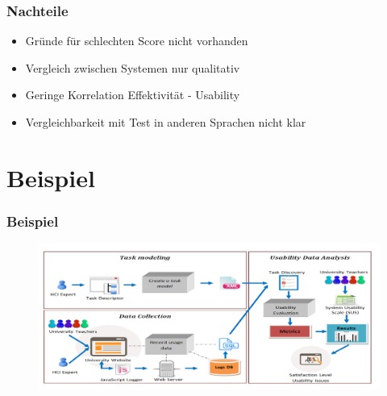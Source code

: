 \documentclass[12pt, aspectratio=169]{beamer}
\begin{document}
\begin{frame}
	\frametitle{Nachteile}
	\begin{itemize}
		\item<1> Gründe für schlechten Score nicht vorhanden
		\item<1> Vergleich zwischen Systemen nur qualitativ
		\item<1> Geringe Korrelation Effektivität - Usability
		\item<1> Vergleichbarkeit mit Test in anderen Sprachen nicht klar
	\end{itemize}
\end{frame}

\section{Beispiel}
\begin{frame}
	\frametitle{Beispiel}
		\begin{figure}
			\centering
			\includegraphics[keepaspectratio=true, width=1\textwidth]{./image/peter.png}
			\caption{\tiny{\cite{harrati2016exploring}}}
		\end{figure}
		
\end{frame}
\end{document}
